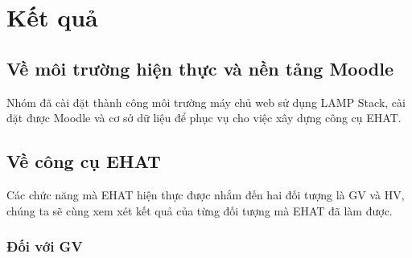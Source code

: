 \setcounter{chapter}{4}
\chapter{Kết quả}

\section{Về môi trường hiện thực và nền tảng Moodle}

Nhóm đã cài đặt thành công môi trường máy chủ web sử dụng LAMP Stack, cài đặt được Moodle và cơ sở dữ liệu để phục vụ cho việc xây dựng công cụ EHAT.

\section{Về công cụ EHAT}

Các chức năng mà EHAT hiện thực được nhắm đến hai đối tượng là GV và HV, chúng ta sẽ cùng xem xét kết quả của từng đối tượng mà EHAT đã làm được.

\subsection{Đối với GV}

